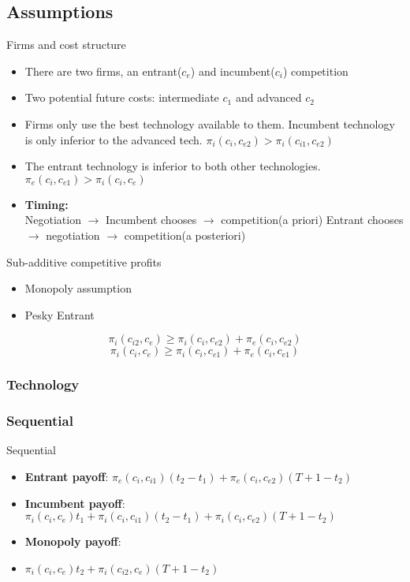 \documentclass{beamer}
\numberwithin{equation}{section}
\begin{document}
\subsection{Assumptions}

\begin{frame}{Firms and cost structure}
\begin{itemize}
    \item There are two firms, an entrant($c_e$) and incumbent($c_i$) competition
    \item Two potential future costs: intermediate $c_1$  and advanced $c_2$
    \item Firms only use the best technology available to them. Incumbent technology is only inferior to the advanced tech. $\pi_{i}(c_{i},c_{e2})>\pi_{i}(c_{i1},c_{e2})$
    \item The entrant technology is inferior to both other technologies. $\pi_{e}(c_{i},c_{e1})>\pi_{i}(c_{i},c_{e})$
    \item \textbf{Timing:} \\
    Negotiation $\rightarrow$  Incumbent chooses  $\rightarrow$ competition(a priori)
    Entrant chooses $\rightarrow$ negotiation $\rightarrow$ competition(a posteriori)
\end{itemize}
\end{frame}

\begin{frame}{Sub-additive competitive profits}
\begin{itemize}
	\item Monopoly assumption
	\item Pesky Entrant
\end{itemize}
\begin{equation*}
\pi_{i}(c_{i2},c_{e}) \geq  \pi_{i}(c_{i},c_{e2}) + \pi_{e}(c_{i},c_{e2})
\end{equation*}
\begin{equation*}
\pi_{i}(c_{i},c_{e}) \geq  \pi_{i}(c_{i},c_{e1}) + \pi_{e}(c_{i},c_{e1})
\end{equation*}
\end{frame}

\subsubsection{Technology}
\subsubsection{Sequential}
\begin{frame}{Sequential}
\begin{itemize}
    \item \textbf{Entrant payoff}: $\pi_e(c_i,c_{i1}) (t_2-t_1) +\pi_e(c_i,c_{e2})(T+1-t_2)$
    \item \textbf{Incumbent payoff}: $\pi_i(c_i,c_{e})t_1+\pi_i(c_i,c_{i1}) (t_2-t_1)+\pi_i(c_i,c_{e2})(T+1-t_2)$
    \item \textbf{Monopoly payoff}:  
    \item $\pi_i(c_i,c_{e}) t_2+\pi_i(c_{i2},c_e)(T+1-t_2)$
\end{itemize}
\end{frame}
\end{document}
